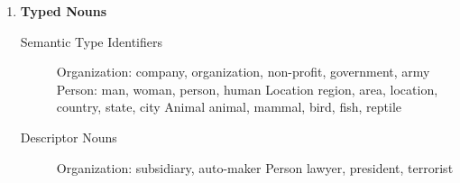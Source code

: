 \documentclass[letterpaper,12pt]{article}
\begin{document}
\begin{enumerate}
\begin{enumerate}
	\item \textbf{Typed Nouns} \\
	  \begin{description}
		 \item[Semantic Type Identifiers] {\sc Organization:} company, organization, non-profit, government, army {\sc Person:} man, woman, person, human {\sc Location} region, area, location, country, state, city {\sc Animal} animal, mammal, bird, fish, reptile
		 \item[Descriptor Nouns] {\sc Organization:} subsidiary, auto-maker {\sc Person} lawyer, president, terrorist
	  \end{description}
\end{enumerate}


\end{enumerate}
\end{document}
